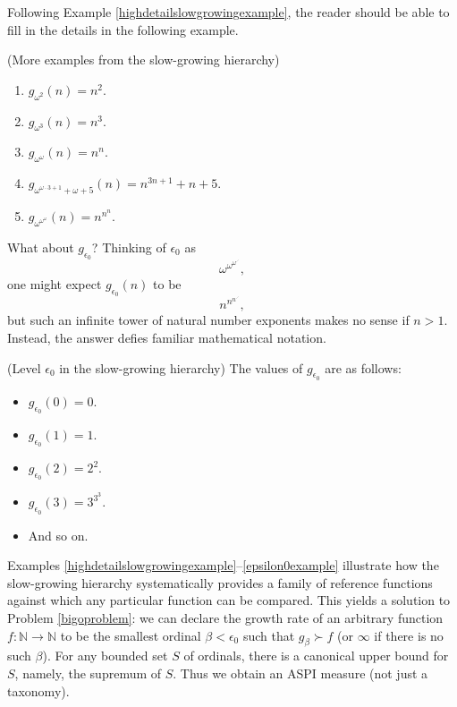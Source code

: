 \documentclass[twoside,11pt]{article}
\begin{document}
Following Example \ref{highdetailslowgrowingexample}, the reader should be able
to fill in the details in the following example.

\begin{example}
    (More examples from the slow-growing hierarchy)
    \begin{enumerate}
        \item
        $g_{\omega^2}(n)=n^2$.
        \item
        $g_{\omega^3}(n)=n^3$.
        \item
        $g_{\omega^\omega}(n)=n^n$.
        \item
        $g_{\omega^{\omega\cdot 3+1}+\omega+5}(n)=n^{3n+1}+n+5$.
        \item
        $g_{\omega^{\omega^{\omega}}}(n)=n^{n^n}$.
    \end{enumerate}
\end{example}

What about $g_{\epsilon_0}$? Thinking of $\epsilon_0$ as
\[\omega^{\omega^{\omega^{\iddots}}},\]
one might expect $g_{\epsilon_0}(n)$ to be
\[n^{n^{n^{\iddots}}},\]
but such an infinite tower
of natural number exponents makes no sense if $n>1$. Instead,
the answer defies familiar mathematical
notation.

\begin{example}
\label{epsilon0example}
(Level $\epsilon_0$ in the slow-growing hierarchy)
The values of $g_{\epsilon_0}$ are as follows:
\begin{itemize}
    \item
    $g_{\epsilon_0}(0)=0$.
    \item
    $g_{\epsilon_0}(1)=1$.
    \item
    $g_{\epsilon_0}(2)=2^2$.
    \item
    $g_{\epsilon_0}(3)=3^{3^{3}}$.
    \item
    And so on.
\end{itemize}
\end{example}

Examples \ref{highdetailslowgrowingexample}--\ref{epsilon0example} illustrate
how the slow-growing hierarchy systematically provides a family of reference
functions against which any particular function can be compared.
This yields a solution to Problem \ref{bigoproblem}: we can declare the growth
rate of an arbitrary function $f:\mathbb N\to\mathbb N$ to be the smallest ordinal
$\beta< \epsilon_0$ such that $g_\beta\succ f$ (or $\infty$ if there is no such
$\beta$).
For any bounded set $S$ of ordinals, there is a canonical upper bound for $S$,
namely, the supremum of $S$.
Thus we obtain an ASPI measure (not just a taxonomy).
\end{document}
